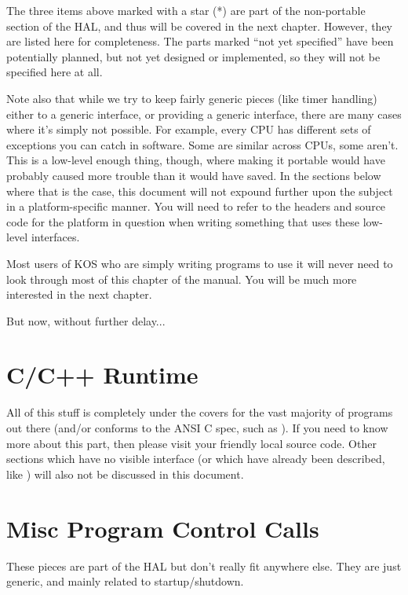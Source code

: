 \documentclass[english]{report}
\begin{document}
The three items above marked with a star (*) are part of the non-portable
section of the HAL, and thus will be covered in the next chapter.
However, they are listed here for completeness. The parts marked ``not
yet specified'' have been potentially planned, but not yet designed
or implemented, so they will not be specified here at all.

Note also that while we try to keep fairly generic pieces (like timer
handling) either to a generic interface, or providing a generic interface,
there are many cases where it's simply not possible. For example,
every CPU has different sets of exceptions you can catch in software.
Some are similar across CPUs, some aren't. This is a low-level enough
thing, though, where making it portable would have probably caused
more trouble than it would have saved. In the sections below where
that is the case, this document will not expound further upon the
subject in a platform-specific manner. You will need to refer to the
headers and source code for the platform in question when writing
something that uses these low-level interfaces.

Most users of KOS who are simply writing programs to use it will never
need to look through most of this chapter of the manual. You will
be much more interested in the next chapter.

But now, without further delay...


\section{C/C++ Runtime}

All of this stuff is completely under the covers for the vast majority
of programs out there (and/or conforms to the ANSI C spec, such as
). If you need to know more about this part, then
please visit your friendly local source code. Other sections which
have no visible interface (or which have already been described, like
) will also not be discussed in this document.


\section{Misc Program Control Calls}

These pieces are part of the HAL but don't really fit anywhere else.
They are just generic, and mainly related to startup/shutdown.
\end{document}
